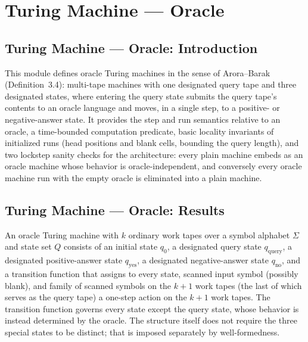 \section{Turing Machine --- Oracle}
\subsection*{Turing Machine --- Oracle: Introduction}

This module defines oracle Turing machines in the sense of Arora--Barak
(Definition~3.4): multi-tape machines with one designated query tape and three
designated states, where entering the query state submits the query tape's
contents to an oracle language and moves, in a single step, to a positive- or
negative-answer state.  It provides the step and run semantics relative to an
oracle, a time-bounded computation predicate, basic locality invariants of
initialized runs (head positions and blank cells, bounding the query length),
and two lockstep sanity checks for the architecture: every plain machine embeds
as an oracle machine whose behavior is oracle-independent, and conversely every
oracle machine run with the empty oracle is eliminated into a plain machine.

\subsection*{Turing Machine --- Oracle: Results}

\begin{definition}
\label{Turing.OracleTM}
\leanok
{}
An oracle Turing machine with $k$ ordinary work tapes over a symbol alphabet
$\Sigma$ and state set $Q$ consists of an initial state $q_0$, a designated
query state $q_{\mathrm{query}}$, a designated positive-answer state
$q_{\mathrm{yes}}$, a designated negative-answer state $q_{\mathrm{no}}$, and a
transition function that assigns to every state, scanned input symbol
(possibly blank), and family of scanned symbols on the $k+1$ work tapes (the
last of which serves as the query tape) a one-step action on the $k+1$ work
tapes.  The transition function governs every state except the query state,
whose behavior is instead determined by the oracle.  The structure itself does
not require the three special states to be distinct; that is imposed
separately by well-formedness.
\end{definition}

